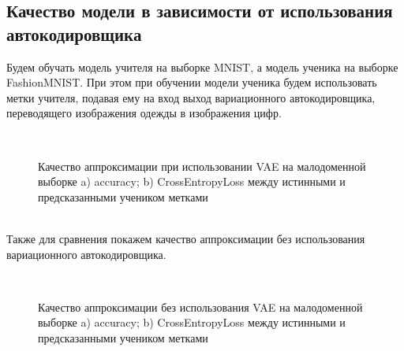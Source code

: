 \subsection{Качество модели в зависимости от использования автокодировщика}
Будем обучать модель учителя на выборке MNIST, а модель ученика на выборке FashionMNIST. При этом при обучении модели ученика будем использовать метки учителя, подавая ему на вход выход вариационного автокодировщика, переводящего изображения одежды в изображения цифр.\\
\begin{figure}[h!t]\center
{}
\\
\caption{Качество аппроксимации при использовании VAE на малодоменной выборке a) accuracy; b) CrossEntropyLoss между истинными и предсказанными учеником метками}
\end{figure}\\
Также для сравнения покажем качество аппроксимации без использования вариационного автокодировщика.\\
\begin{figure}[h!t]\center
{}
\\
\caption{Качество аппроксимации без использования VAE на малодоменной выборке a) accuracy; b) CrossEntropyLoss между истинными и предсказанными учеником метками}
\end{figure}

